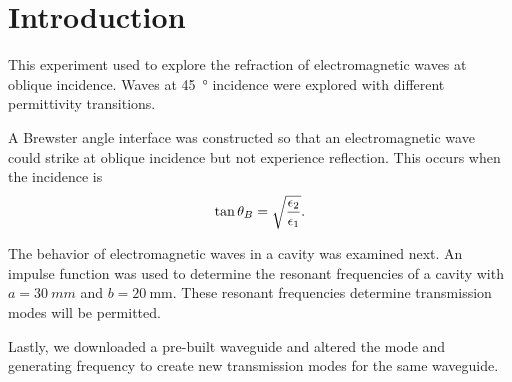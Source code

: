 \section{Introduction}\label{sec:intro}
This experiment used \mefisto{} to explore the refraction of electromagnetic waves at oblique incidence.
Waves at \SI{45}{\degree} incidence were explored with different permittivity transitions. 

A Brewster angle interface was constructed so that an electromagnetic wave could strike at oblique incidence but not experience reflection. This occurs when the incidence is
\begin{equation}\label{eqn:brewster}
	\tan\theta_B = \sqrt{{\epsilon_2 \over \epsilon_1}}.
\end{equation}

The behavior of electromagnetic waves in a cavity was examined next. An impulse function was used to determine the resonant frequencies of a cavity with $a = \SI{30}{mm}$ and $b = \SI{20}{\milli\meter}$. These resonant frequencies determine transmission modes will be permitted.

Lastly, we downloaded a pre-built \mefisto{} waveguide and altered the mode and generating frequency to create new transmission modes for the same waveguide.
